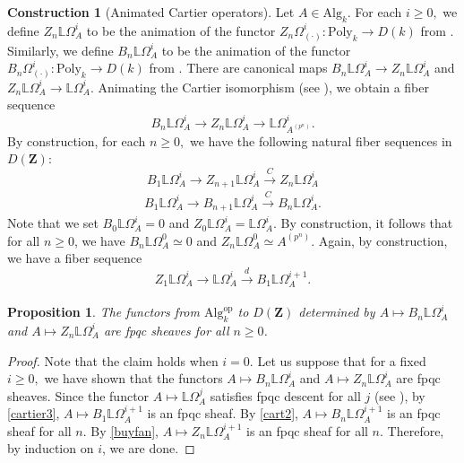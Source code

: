 \documentclass[10pt,letterpaper]{amsart}
\numberwithin{figure}{section}
\numberwithin{equation}{section}
\newtheorem{proposition}[figure]{Proposition}
\theoremstyle{definition}
\theoremstyle{definition}
\theoremstyle{definition}
\theoremstyle{definition}
\newtheorem{construction}[figure]{Construction}
\newcommand{\LL}{\L}
\renewcommand{\L}{\mathbb{L}}
\newcommand{\Z}{\mathbf{Z}}
\begin{document}
\begin{construction}[Animated Cartier operators]
Let $A \in \mathrm{Alg}_k.$ For each $i \ge 0,$ we define $Z_n \L \Omega^i_A$ to be the animation of the functor $Z_n \Omega^i_{(\cdot)}: \mathrm{Poly}_k \to D(k)$ from \cite[\S~2.2.2]{Luc1}.
Similarly, we define $B_n \L \Omega^i_A$ to be the animation of the functor $B_n \Omega^i_{(\cdot)}: \mathrm{Poly}_k \to D(k)$ from \cite[\S~2.2.2]{Luc1}. There are canonical maps $B_n \L \Omega^i_A \to Z_n \L \Omega^i_A$ and $Z_n \L \Omega^i_A  \to \L \Omega^i_A.$ Animating the Cartier isomorphism (see \cite[\S~2]{Luc1}), we obtain a fiber sequence
\begin{equation}\label{buyfan}
    B_n \L \Omega^i_A \to Z_n \L \Omega^i_A \to \L\Omega^i _{A^{(p^n)}}.
\end{equation}By construction, for each $n \ge 0,$ we have the following natural fiber sequences in $D(\Z)$:
\begin{equation}\label{cart1}
  B_1 \LL \Omega^i_A \to  Z_{n+1} \L \Omega^i_A \xrightarrow[]{C} Z_{n} \L \Omega^i_{A}
\end{equation}\begin{equation}\label{cart2}
    B_1 \LL \Omega^i_A \to  B_{n+1} \L \Omega^i_A \xrightarrow[]{C} B_{n} \L \Omega^i_A.
\end{equation}{}
Note that we set $B_0 \L\Omega^i_A = 0$ and $Z_0 \L\Omega^i_A = \L\Omega^i_A.$ By construction, it follows that for all $n \ge 0$, we have $B_n \LL \Omega^0_A \simeq 0$ and $Z_n \LL \Omega^0_A \simeq A^{(p^n)}.$ Again, by construction, we have a fiber sequence
\begin{equation}\label{cartier3}
    Z_1 \L \Omega^i_A \to \L \Omega^i_A \xrightarrow[]{d} B_1 \LL \Omega^{i+1}_A.
\end{equation}

\end{construction}{}


\begin{proposition}
The functors from $\mathrm{Alg}_k^{\mathrm{op}}$ to $D(\Z)$ determined by $A \mapsto B_n \LL \Omega^i_A $ and $A \mapsto Z_n \LL \Omega^i_A$ are fpqc sheaves for all $n \ge 0$. 
\end{proposition}{}

\begin{proof}
  Note that the claim holds when $i=0.$ Let us suppose that for a fixed $i \ge 0,$ we have shown that the functors $A \mapsto B_n \LL \Omega^i_A $ and $A \mapsto Z_n \LL \Omega^i_A$ are fpqc sheaves. Since the functor $A \mapsto \LL\Omega_A^j$ satisfies fpqc descent for all $j$ (see \cite[Thm.~3.1]{BMS2}), by \cref{cartier3}, $A \mapsto B_1 \LL \Omega_A^{i+1}$ is an fpqc sheaf. By \cref{cart2}, $A \mapsto B_n \LL \Omega_A^{i+1}$ is an fpqc sheaf for all $n.$ By \cref{buyfan}, $A \mapsto Z_n \LL \Omega_A^{i+1}$ is an fpqc sheaf for all $n.$ Therefore, by induction on $i$, we are done.
\end{proof}{}
\end{document}
